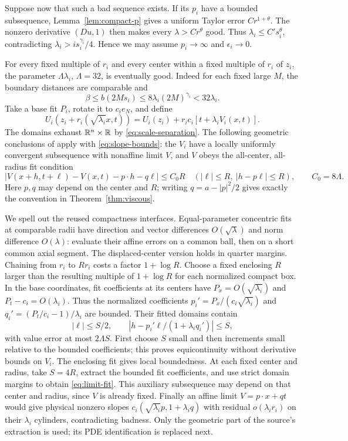 Suppose now that such a bad sequence exists. If its $p_i$ have a
bounded subsequence, Lemma~\ref{lem:compact-p} gives a uniform Taylor
error $Cr^{1+\theta}$. The nonzero derivative $(Du,1)$ then makes
every $\lambda>Cr^\theta$ good. Thus
$\lambda_i\leq C's_i^\theta$, contradicting
$\lambda_i>i s_i^{\gamma_i}/4$. Hence we may assume $p_i\to\infty$
and $\epsilon_i\to0$.

For every fixed multiple of $r_i$ and every center within a fixed
multiple of $r_i$ of $z_i$, the parameter $\Lambda\lambda_i$,
$\Lambda=32$, is eventually good. Indeed for each fixed large $M$,
the boundary distances are comparable and
\[
 \beta\leq b(2Ms_i)\leq8\lambda_i(2M)^{\gamma_i}<32\lambda_i.
\]
Take a base fit $P_i$, rotate it to $c_ie_N$, and define
\begin{equation}\label{eq:anisotropic-scale}
 U_i(z_i+r_i(\sqrt{\lambda_i}x,t))
   =U_i(z_i)+r_ic_i[t+\lambda_i V_i(x,t)].
\end{equation}
The domains exhaust $\mathbb R^n\times\mathbb R$ by
\eqref{eq:scale-separation}. The following geometric conclusions of
\cite[Section 3]{OpenAI} apply with \eqref{eq:slope-bounds}:
the $V_i$ have a locally uniformly convergent subsequence with
nonaffine limit $V$, and $V$ obeys the all-center, all-radius fit
condition
\begin{equation}\label{eq:limit-fit}
 |V(x+h,t+\ell)-V(x,t)-p\cdot h-q\ell|\leq C_0R
 \quad(|\ell|\leq R,\ |h-p\ell|\leq R),
 \qquad C_0=8\Lambda.
\end{equation}
Here $p,q$ may depend on the center and $R$; writing
$q=a-|p|^2/2$ gives exactly the convention in
Theorem~\ref{thm:viscous}.

We spell out the reused compactness interfaces. Equal-parameter
concentric fits at comparable radii have direction and vector
differences $O(\sqrt\lambda)$ and norm difference $O(\lambda)$:
evaluate their affine errors on a common ball, then on a short common
axial segment. The displaced-center version holds in quarter margins.
Chaining from $r_i$ to $Rr_i$ costs a factor $1+\log R$. Choose a
fixed enclosing $R$ larger than the resulting multiple of
$1+\log R$ for each normalized compact box. In the base coordinates,
fit coefficients at its centers have
$P_x=O(\sqrt{\lambda_i})$ and $P_t-c_i=O(\lambda_i)$.
Thus the normalized coefficients
$p_i'=P_x/(c_i\sqrt{\lambda_i})$ and
$q_i'=(P_t/c_i-1)/\lambda_i$ are bounded. Their fitted domains
contain
\[
 |\ell|\leq S/2,\qquad
 |h-p_i'\ell/(1+\lambda_iq_i')|\leq S,
\]
with value error at most $2\Lambda S$. First choose $S$ small and
then increments small relative to the bounded coefficients; this
proves equicontinuity without derivative bounds on $V_i$. The
enclosing fit gives local boundedness. At each fixed center and
radius, take $S=4R$, extract the bounded fit coefficients, and use
strict domain margins to obtain \eqref{eq:limit-fit}. This auxiliary
subsequence may depend on that center and radius, since $V$ is
already fixed. Finally an affine limit $V=p\cdot x+qt$ would give
physical nonzero slopes $c_i(\sqrt{\lambda_i}p,1+\lambda_iq)$
with residual $o(\lambda_ir_i)$ on their $\lambda_i$ cylinders,
contradicting badness. Only the geometric part of the source's
extraction is used; its PDE identification is replaced next.

